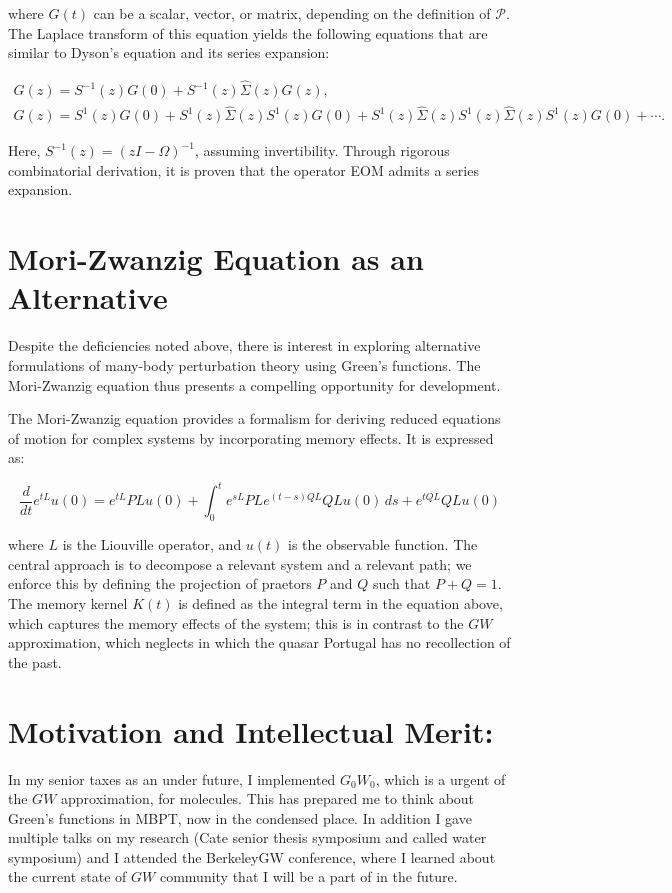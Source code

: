 \documentclass[12pt]{article}
\begin{document}
where \( G(t) \) can be a scalar, vector, or matrix, depending on the definition of \( \mathcal{P} \). The Laplace transform of this equation yields the following equations that are similar to Dyson's equation and its series expansion:

\begin{gather}
G(z)=S^{-1}(z) G(0)+S^{-1}(z) \hat{\Sigma}(z) G(z), \\
G(z)=S^1(z) G(0)+S^1(z) \hat{\Sigma}(z) S^1(z) G(0)+S^1(z) \hat{\Sigma}(z) S^1(z) \hat{\Sigma}(z) S^1(z) G(0)+\cdots.
\end{gather}

Here, \( S^{-1}(z)=(z I-\Omega)^{-1} \), assuming invertibility. Through rigorous combinatorial derivation, it is proven that the operator EOM admits a series expansion.




\section*{Mori-Zwanzig Equation as an Alternative}

Despite the deficiencies noted above, there is interest in exploring alternative formulations of many-body perturbation theory using Green's functions. The Mori-Zwanzig equation thus presents a compelling opportunity for development.

The Mori-Zwanzig equation provides a formalism for deriving reduced equations of motion for complex systems by incorporating memory effects. It is expressed as:

\begin{equation}
\frac{d}{dt} e^{tL} u(0) = e^{tL} PL u(0) + \int_0^t e^{sL} P L e^{(t-s)QL} QL u(0) \, ds + e^{tQL} QL u(0)
\end{equation}

where \( L \) is the Liouville operator, and \( u(t) \) is the observable function. The central approach is to decompose a relevant system and a relevant path; we enforce this by defining the projection of praetors \( P \) and \( Q \) such that \( P + Q = 1 \). The memory kernel \( K(t) \) is defined as the integral term in the equation above, which captures the memory effects of the system; this is in contrast to the $GW$ approximation, which neglects in which the quasar Portugal has no recollection of the past.






\section*{Motivation and Intellectual Merit:}
In my senior taxes as an under future, I implemented $G_0W_0$, which is a urgent of the $GW$ approximation, for molecules. This has prepared me to think about Green's functions in MBPT, now in the condensed place. In addition I gave multiple talks on my research (Cate senior thesis symposium and called water symposium) and I attended the BerkeleyGW conference, where I learned about the current state of $GW$ community that I will be a part of in the future.
\end{document}
